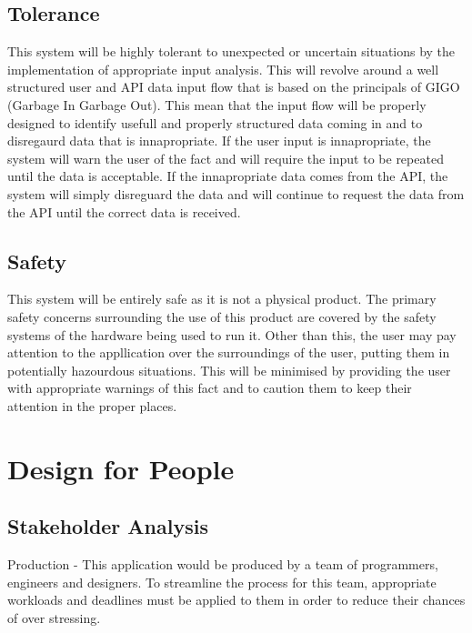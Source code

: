 \documentclass[paper=a4, fontsize=12pt]{scrartcl} %
\numberwithin{equation}{section} %
\numberwithin{figure}{section} %
\numberwithin{table}{section} %
\begin{document}
        \subsection{Tolerance}

            This system will be highly tolerant to unexpected or uncertain situations by the implementation of appropriate input analysis. This will revolve around a well structured user and API data input flow that is based on the principals of GIGO (Garbage In Garbage Out). This mean that the input flow will be properly designed to identify usefull and properly structured data coming in and to disregaurd data that is innapropriate. If the user input is innapropriate, the system will warn the user of the fact and will require the input to be repeated until the data is acceptable. If the innapropriate data comes from the API, the system will simply disreguard the data and will continue to request the data from the API until the correct data is received.

        \subsection{Safety}

            This system will be entirely safe as it is not a physical product. The primary safety concerns surrounding the use of this product are covered by the safety systems of the hardware being used to run it. Other than this, the user may pay attention to the appllication over the surroundings of the user, putting them in potentially hazourdous situations. This will be minimised by providing the user with appropriate warnings of this fact and to caution them to keep their attention in the proper places.

    \section{Design for People}

        \subsection{Stakeholder Analysis}

            Production - This application would be produced by a team of programmers, engineers and designers. To streamline the process for this team, appropriate workloads and deadlines must be applied to them in order to reduce their chances of over stressing.\\
\end{document}
